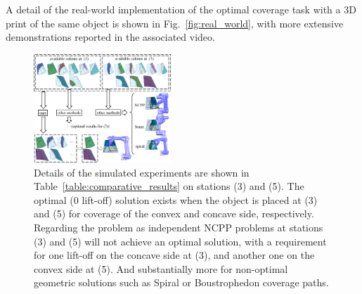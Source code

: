 \documentclass[letterpaper, 10pt, conference]{ieeeconf}
\begin{document}
A detail of the real-world implementation of the optimal coverage task with a 3D print of the same object is shown in Fig.~\ref{fig:real_world}, with more extensive demonstrations reported in the associated video. 


\begin{figure}[t]
\centering
\includegraphics[width = 0.46\textwidth]{figures/blade_demo/details} %
\caption{Details of the simulated experiments are shown in Table~\ref{table:comparative_results} on stations (3) and (5). 
The optimal ($0$ lift-off) solution exists when the object is placed at (3) and (5) for coverage of the convex and concave side, respectively. Regarding the problem as independent NCPP problems at stations (3) and (5) will not achieve an optimal solution, with a requirement for one lift-off on the concave side at (3), and another one on the convex side at (5). And substantially more for non-optimal geometric solutions such as Spiral or Boustrophedon coverage paths.}
\label{fig:detailed_colour}
\vspace{-0.5cm}
\end{figure}
\end{document}
